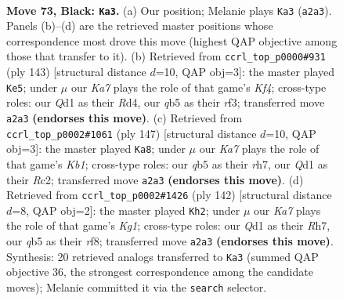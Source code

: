 \documentclass[11pt]{article}
\begin{document}
\clearpage

\begin{figure}[p]\centering
\begin{subfigure}{0.46\textwidth}\centering
\resizebox{\linewidth}{!}{%
\newchessgame
\chessboard[
  setfen={8/7K/6N1/1Q6/8/8/k7/3q4 b - - 16 73},
  showmover=false,
  pgfstyle=straightmove, color=movearrow, markmove={a2-a3}
]}
\caption{}
\end{subfigure}\hfill
\begin{subfigure}{0.46\textwidth}\centering
\resizebox{\linewidth}{!}{%
\newchessgame
\chessboard[
  setfen={8/8/8/5k2/3r4/5R2/6N1/6K1 b - - 2 72},
  showmover=false,
  pgfstyle=straightmove, color=movearrow, markmove={f5-e5}
]}
\caption{}
\end{subfigure}
\\[4pt]
\begin{subfigure}{0.46\textwidth}\centering
\resizebox{\linewidth}{!}{%
\newchessgame
\chessboard[
  setfen={1k6/7R/1p1N4/4K3/8/8/2r5/8 b - - 12 74},
  showmover=false,
  pgfstyle=straightmove, color=movearrow, markmove={b8-a8}
]}
\caption{}
\end{subfigure}\hfill
\begin{subfigure}{0.46\textwidth}\centering
\resizebox{\linewidth}{!}{%
\newchessgame
\chessboard[
  setfen={5r2/7R/8/8/3kn3/P7/8/6K1 w - - 8 72},
  showmover=false,
  pgfstyle=straightmove, color=movearrow, markmove={g1-h2}
]}
\caption{}
\end{subfigure}
\caption{\textbf{Move 73, Black: \texttt{Ka3}.} (a) Our position; Melanie plays \texttt{Ka3} (\texttt{a2a3}). Panels (b)--(d) are the retrieved master positions whose correspondence most drove this move (highest QAP objective among those that transfer to it). (b) Retrieved from \texttt{ccrl\_top\_p0000\#931} (ply 143) [structural distance $d$=10, QAP obj=3]: the master played \texttt{Ke5}; under $\mu$ our \emph{Ka7} plays the role of that game's \emph{Kf4}; cross-type roles: our \emph{Q}d1 as their \emph{R}d4, our \emph{q}b5 as their \emph{r}f3; transferred move \texttt{a2a3} \textbf{(endorses this move)}. (c) Retrieved from \texttt{ccrl\_top\_p0002\#1061} (ply 147) [structural distance $d$=10, QAP obj=3]: the master played \texttt{Ka8}; under $\mu$ our \emph{Ka7} plays the role of that game's \emph{Kb1}; cross-type roles: our \emph{q}b5 as their \emph{r}h7, our \emph{Q}d1 as their \emph{R}c2; transferred move \texttt{a2a3} \textbf{(endorses this move)}. (d) Retrieved from \texttt{ccrl\_top\_p0002\#1426} (ply 142) [structural distance $d$=8, QAP obj=2]: the master played \texttt{Kh2}; under $\mu$ our \emph{Ka7} plays the role of that game's \emph{Kg1}; cross-type roles: our \emph{Q}d1 as their \emph{R}h7, our \emph{q}b5 as their \emph{r}f8; transferred move \texttt{a2a3} \textbf{(endorses this move)}. Synthesis: 20 retrieved analogs transferred to \texttt{Ka3} (summed QAP objective 36, the strongest correspondence among the candidate moves); Melanie committed it via the \texttt{search} selector.}
\label{fig:thought-m145}
\end{figure}
\end{document}
